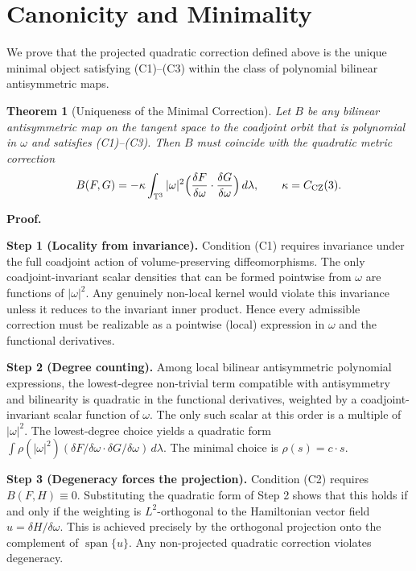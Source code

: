 \documentclass[11pt,a4paper]{article}
\newtheorem{theorem}{Theorem}
\begin{document}
\section{Canonicity and Minimality}

We prove that the projected quadratic correction defined above is the unique minimal object satisfying (C1)--(C3) within the class of polynomial bilinear antisymmetric maps.

\begin{theorem}[Uniqueness of the Minimal Correction]
Let \(B\) be any bilinear antisymmetric map on the tangent space to the coadjoint orbit that is polynomial in \(\omega\) and satisfies (C1)--(C3). Then \(B\) must coincide with the quadratic metric correction
\[
B(F, G) = -\kappa \int_{\mathbb{T}^3} |\omega|^2 \Bigl( \frac{\delta F}{\delta \omega} \cdot \frac{\delta G}{\delta \omega} \Bigr) \, d\lambda, \qquad \kappa = C_{\rm CZ}(3).
\]
\end{theorem}

\textbf{Proof.}

\textbf{Step 1 (Locality from invariance).} Condition (C1) requires invariance under the full coadjoint action of volume-preserving diffeomorphisms. The only coadjoint-invariant scalar densities that can be formed pointwise from \(\omega\) are functions of \(|\omega|^2\). Any genuinely non-local kernel would violate this invariance unless it reduces to the invariant inner product. Hence every admissible correction must be realizable as a pointwise (local) expression in \(\omega\) and the functional derivatives.

\textbf{Step 2 (Degree counting).} Among local bilinear antisymmetric polynomial expressions, the lowest-degree non-trivial term compatible with antisymmetry and bilinearity is quadratic in the functional derivatives, weighted by a coadjoint-invariant scalar function of \(\omega\). The only such scalar at this order is a multiple of \(|\omega|^2\). The lowest-degree choice yields a quadratic form \(\int \rho(|\omega|^2) (\delta F / \delta \omega \cdot \delta G / \delta \omega) \, d\lambda\). The minimal choice is \(\rho(s) = c \cdot s\).

\textbf{Step 3 (Degeneracy forces the projection).} Condition (C2) requires \(B(F, H) \equiv 0\). Substituting the quadratic form of Step 2 shows that this holds if and only if the weighting is \(L^2\)-orthogonal to the Hamiltonian vector field \(u = \delta H / \delta \omega\). This is achieved precisely by the orthogonal projection onto the complement of \(\operatorname{span}\{u\}\). Any non-projected quadratic correction violates degeneracy.
\end{document}
